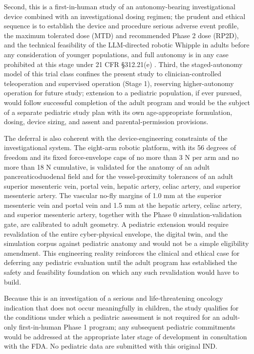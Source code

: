 Second,
this is a first-in-human study of an autonomy-bearing investigational device
combined with an investigational dosing regimen; the prudent and ethical sequence
is to establish the device and procedure serious adverse event profile, the maximum
tolerated dose (MTD) and recommended Phase 2 dose (RP2D), and the technical
feasibility of the LLM-directed robotic Whipple in adults before any consideration
of younger populations, and full autonomy is in any case prohibited at this stage
under 21 CFR \S 312.21(e) \cite{cfr312paiuni}. Third, the staged-autonomy model of
this trial class confines the present study to clinician-controlled teleoperation
and supervised operation (Stage 1), reserving higher-autonomy operation for future
study; extension to a pediatric population, if ever pursued, would follow successful
completion of the adult program and would be the subject of a separate pediatric
study plan with its own age-appropriate formulation, dosing, device sizing, and
assent and parental-permission provisions.

The deferral is also coherent with the device-engineering constraints of the
investigational system. The eight-arm robotic platform, with its 56 degrees of
freedom and its fixed force-envelope caps of no more than 3 N per arm and no more
than 18 N cumulative, is validated for the anatomy of an adult pancreaticoduodenal
field and for the vessel-proximity tolerances of an adult superior mesenteric vein,
portal vein, hepatic artery, celiac artery, and superior mesenteric artery. The
vascular no-fly margins of 1.0 mm at the superior mesenteric vein and portal vein
and 1.5 mm at the hepatic artery, celiac artery, and superior mesenteric artery,
together with the Phase 0 simulation-validation gate, are calibrated to adult
geometry. A pediatric extension would require revalidation of the entire
cyber-physical envelope, the digital twin, and the simulation corpus against
pediatric anatomy and would not be a simple eligibility amendment. This engineering
reality reinforces the clinical and ethical case for deferring any pediatric
evaluation until the adult program has established the safety and feasibility
foundation on which any such revalidation would have to build.

Because this is an investigation of a serious and life-threatening oncology
indication that does not occur meaningfully in children, the study qualifies for
the conditions under which a pediatric assessment is not required for an adult-only
first-in-human Phase 1 program; any subsequent pediatric commitments would be
addressed at the appropriate later stage of development in consultation with the
FDA. No pediatric data are submitted with this original IND.

